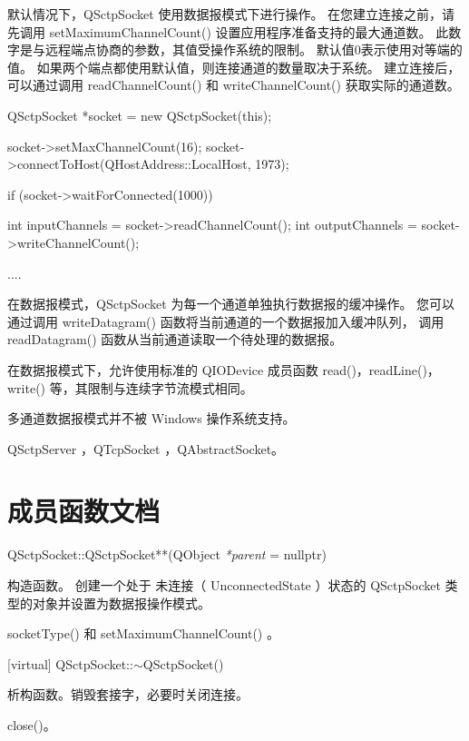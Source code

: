 默认情况下，QSctpSocket 使用数据报模式下进行操作。 
在您建立连接之前，请先调用 setMaximumChannelCount() 设置应用程序准备支持的最大通道数。 
此数字是与远程端点协商的参数，其值受操作系统的限制。 默认值0表示使用对等端的值。
如果两个端点都使用默认值，则连接通道的数量取决于系统。 建立连接后，
可以通过调用 readChannelCount() 和 writeChannelCount() 获取实际的通道数。

\begin{cppcode}
 QSctpSocket *socket = new QSctpSocket(this);

socket->setMaxChannelCount(16);
socket->connectToHost(QHostAddress::LocalHost, 1973);

if (socket->waitForConnected(1000)) {
	int inputChannels = socket->readChannelCount();
	int outputChannels = socket->writeChannelCount();

	....
}
\end{cppcode}


在数据报模式，QSctpSocket 为每一个通道单独执行数据报的缓冲操作。
您可以通过调用 writeDatagram() 函数将当前通道的一个数据报加入缓冲队列，
调用 readDatagram() 函数从当前通道读取一个待处理的数据报。

在数据报模式下，允许使用标准的 QIODevice 成员函数 read()，readLine()，
write() 等，其限制与连续字节流模式相同。


\begin{notice}
多通道数据报模式并不被 Windows 操作系统支持。
\end{notice}

\begin{seeAlso}
QSctpServer ，QTcpSocket ，QAbstractSocket。
\end{seeAlso}

\section{成员函数文档}

QSctpSocket::QSctpSocket**(QObject \emph{*parent} = nullptr)

构造函数。
创建一个处于 未连接（ UnconnectedState ）状态的 QSctpSocket 类型的对象并设置为数据报操作模式。

\begin{seeAlso}
socketType() 和 setMaximumChannelCount() 。
\end{seeAlso}

[virtual] QSctpSocket::$\sim$QSctpSocket()

析构函数。销毁套接字，必要时关闭连接。

\begin{seeAlso}
close()。
\end{seeAlso}

